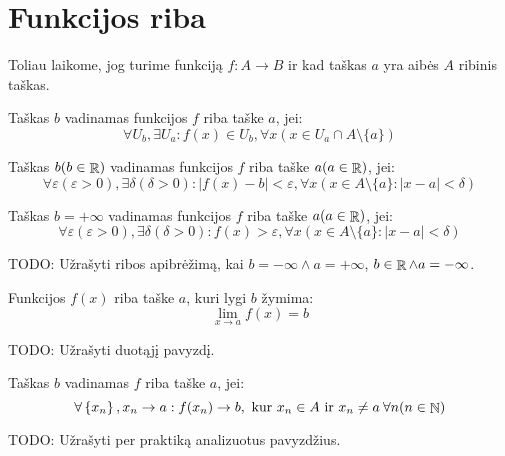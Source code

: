 \section{Funkcijos riba}

\begin{note}
  Toliau laikome, jog turime funkciją $f : A \to B$ ir kad taškas $a$ 
  yra aibės $A$ ribinis taškas.
\end{note}

\begin{defn}
  \label{limfed}
  Taškas $b$ vadinamas funkcijos $f$ riba taške $a$, jei:
  \[
  \forall U_b, \exists U_a : f(x) \in U_b,%
  \forall x (x \in U_a \cap A \setminus \{a\})
  \]
\end{defn}

\begin{defn}
  Taškas $b (b \in \mathop{\mathbb{R}})$ vadinamas funkcijos $f$ riba taške 
  $a (a \in \mathop{\mathbb{R}})$, jei:
  \[
  \forall \varepsilon (\varepsilon > 0), \exists \delta (\delta > 0):%
  |f(x) - b| < \varepsilon,%
  \forall x (x \in A \setminus \{a\} : |x - a| < \delta)
  \]
\end{defn}

\begin{defn}
  Taškas $b = +\infty$ vadinamas funkcijos $f$ riba taške $a (a \in \mathop{\mathbb{R}})$,
  jei:
  \[
  \forall \varepsilon (\varepsilon > 0), \exists \delta (\delta > 0) :%
  f(x) > \varepsilon,%
  \forall x (x \in A \setminus \{a\} : |x - a| < \delta)
  \]
\end{defn}

TODO: Užrašyti ribos apibrėžimą, kai $b=-\infty \land a=+\infty$, 
$b \in \mathop{\mathbb{R}} \land a=-\infty$.

\begin{notation}
  Funkcijos $f(x)$ riba taške $a$, kuri lygi $b$ žymima:
  \[
  \lim _{x \to a} f(x) = b
  \]
\end{notation}

TODO: Užrašyti duotąjį pavyzdį.

\begin{defn}
  \label{limfs}
  Taškas $b$ vadinamas $f$ riba taške $a$, jei:
  \[
  \forall \left\{ x_{n} \right\}, x_{n} \to a :%
  f(x_{n}) \to b, \text{ kur } x_{n} \in A \text{ ir } x_{n} \neq a \:%
  \forall n (n \in \NSET)%
  \]
\end{defn}

TODO: Užrašyti per praktiką analizuotus pavyzdžius.

